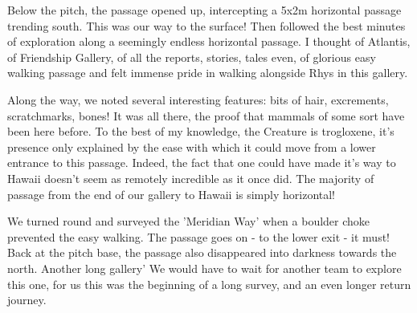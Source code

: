 Below the pitch, the passage opened up, intercepting a 5x2m horizontal passage trending south. This was our way to the surface! Then followed the best minutes of exploration along a seemingly endless horizontal passage. I thought of Atlantis, of Friendship Gallery, of all the reports, stories, tales even, of glorious easy walking passage and felt immense pride in walking alongside Rhys in this gallery. 

Along the way, we noted several interesting features: bits of hair, excrements, scratchmarks, bones! It was all there, the proof that mammals of some sort have been here before. To the best of my knowledge, the Creature is trogloxene, it's presence only explained by the ease with which it could move from a lower entrance to this passage. Indeed, the fact that one could have made it's way to Hawaii doesn't seem as remotely incredible as it once did. The majority of passage from the end of our gallery to Hawaii is simply horizontal! 

We turned round and surveyed the 'Meridian Way' when a boulder choke prevented the easy walking. The passage goes on - to the lower exit - it must! Back at the pitch base, the passage also disappeared into darkness towards the north. Another long gallery' We would have to wait for another team to explore this one, for us this was the beginning of a long survey, and an even longer return journey.